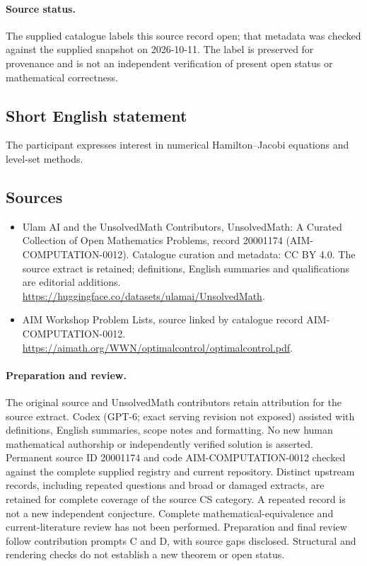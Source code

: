 \documentclass[11pt]{article}
\begin{document}
\paragraph{Source status.}
The supplied catalogue labels this source record open; that metadata was checked against the supplied snapshot on 2026-10-11. The label is preserved for provenance and is not an independent verification of present open status or mathematical correctness.
\subsection{Short English statement}
The participant expresses interest in numerical Hamilton--Jacobi equations and level-set methods.
\subsection{Sources}
\begin{itemize}
\item[\hypertarget{source:20001174:1}{S1}] Ulam AI and the UnsolvedMath Contributors, UnsolvedMath: A Curated Collection of Open Mathematics Problems, record 20001174 (AIM-COMPUTATION-0012). Catalogue curation and metadata: CC BY 4.0. The source extract is retained; definitions, English summaries and qualifications are editorial additions.
\url{https://huggingface.co/datasets/ulamai/UnsolvedMath}.
\item[\hypertarget{source:20001174:2}{S2}] AIM Workshop Problem Lists, source linked by catalogue record AIM-COMPUTATION-0012.
\url{https://aimath.org/WWN/optimalcontrol/optimalcontrol.pdf}.
\end{itemize}
\paragraph{Preparation and review.}
The original source and UnsolvedMath contributors retain attribution for the source extract. Codex (GPT-6; exact serving revision not exposed) assisted with definitions, English summaries, scope notes and formatting. No new human mathematical authorship or independently verified solution is asserted. Permanent source ID 20001174 and code AIM-COMPUTATION-0012 checked against the complete supplied registry and current repository. Distinct upstream records, including repeated questions and broad or damaged extracts, are retained for complete coverage of the source CS category. A repeated record is not a new independent conjecture. Complete mathematical-equivalence and current-literature review has not been performed. Preparation and final review follow contribution prompts C and D, with source gaps disclosed. Structural and rendering checks do not establish a new theorem or open status.
\label{end:20001174}
\end{document}
